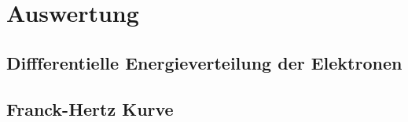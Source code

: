 \section{Auswertung}
\label{sec:Auswertung}

\subsection{Diffferentielle Energieverteilung der Elektronen}

\subsection{Franck-Hertz Kurve}